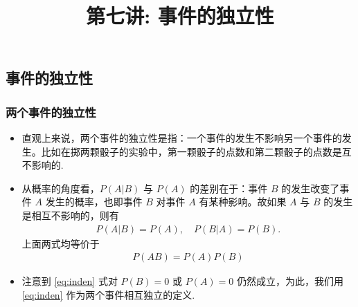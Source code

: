 

\title[概率论]{第七讲: 事件的独立性}
\date{}

{
	\begin{frame}
		\titlepage
	\end{frame}
}
\subsection{事件的独立性}

\begin{frame}
  \frametitle{两个事件的独立性}
  \begin{itemize}[<+-|alert@+>]
  \item 直观上来说，两个事件的独立性是指：一个事件的发生不影响另一个事件的发生。比如在掷两颗骰子的实验中，第一颗骰子的点数和第二颗骰子的点数是互不影响的.
  \item 从概率的角度看，$P (A|B)$ 与 $P (A)$ 的差别在于：事件 $B$ 的发生改变了事件 $A$ 发生的概率，也即事件 $B$ 对事件 $A$ 有某种影响。故如果 $A$ 与 $B$ 的发生是相互不影响的，则有 \pause
    \begin{eqnarray*}
      P(A|B)=P(A),\quad P(B|A)=P(B).
    \end{eqnarray*}
    \pause 上面两式均等价于
    \begin{eqnarray}\label{eq:inden}
      P(AB)=P(A)P(B)
    \end{eqnarray}
  \item 注意到 \eqref{eq:inden} 式对 $P (B)=0$ 或 $P (A)=0$ 仍然成立，为此，我们用 \eqref{eq:inden} 作为两个事件相互独立的定义.
  \end{itemize}
\end{frame}

